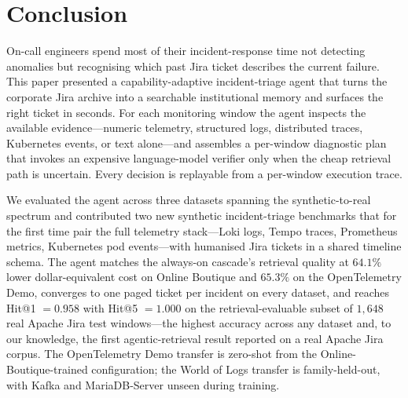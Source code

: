 %

\section{Conclusion}
\label{sec:conclusion}

On-call engineers spend most of their incident-response time not detecting anomalies but recognising which past Jira ticket describes the current failure. This paper presented a capability-adaptive incident-triage agent that turns the corporate Jira archive into a searchable institutional memory and surfaces the right ticket in seconds. For each monitoring window the agent inspects the available evidence---numeric telemetry, structured logs, distributed traces, Kubernetes events, or text alone---and assembles a per-window diagnostic plan that invokes an expensive language-model verifier only when the cheap retrieval path is uncertain. Every decision is replayable from a per-window execution trace.

We evaluated the agent across three datasets spanning the synthetic-to-real spectrum and contributed two new synthetic incident-triage benchmarks that for the first time pair the full telemetry stack---Loki logs, Tempo traces, Prometheus metrics, Kubernetes pod events---with humanised Jira tickets in a shared timeline schema. The agent matches the always-on cascade's retrieval quality at $64.1\%$ lower dollar-equivalent cost on Online Boutique and $65.3\%$ on the OpenTelemetry Demo, converges to one paged ticket per incident on every dataset, and reaches Hit@1 $= 0.958$ with Hit@5 $= 1.000$ on the retrieval-evaluable subset of $1{,}648$ real Apache Jira test windows---the highest accuracy across any dataset and, to our knowledge, the first agentic-retrieval result reported on a real Apache Jira corpus. The OpenTelemetry Demo transfer is zero-shot from the Online-Boutique-trained configuration; the World of Logs transfer is family-held-out, with Kafka and MariaDB-Server unseen during training.


